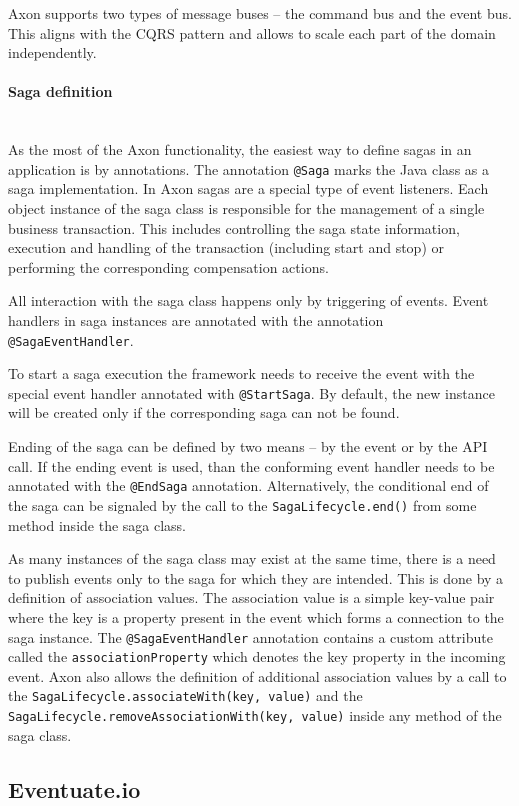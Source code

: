 \documentclass[oneside,
  digital, %
  table,   %
  nolof,     %
  nolot,     %
]{fithesis3}
\newcommand{\newlinepar}[1]{\paragraph{#1}\needspace{4\baselineskip}\mbox{}\\}
\begin{document}
Axon supports two types of message buses -- the command bus and the event bus. This aligns with the CQRS pattern and allows to scale each part of the domain independently.

\newlinepar{Saga definition}

As the most of the Axon functionality, the easiest way to define sagas in an application is by annotations. The annotation \texttt{@Saga} marks the Java class as a saga implementation. In Axon sagas are a special type of event listeners. Each object instance of the saga class is responsible for the management of a single business transaction. This includes controlling the saga state information, execution and handling of the transaction (including start and stop) or performing the corresponding compensation actions.

All interaction with the saga class happens only by triggering of events. Event handlers in saga instances are annotated with the annotation \texttt{@SagaEventHandler}. 

To start a saga execution the framework needs to receive the event with the special event handler annotated with \texttt{@StartSaga}. By default, the new instance will be created only if the corresponding saga can not be found.

Ending of the saga can be defined by two means -- by the event or by the API call. If the ending event is used, than the conforming event handler needs to be annotated with the \texttt{@EndSaga} annotation. Alternatively, the conditional end of the saga can be signaled by the call to the \texttt{SagaLifecycle.end()} from some method inside the saga class.

As many instances of the saga class may exist at the same time, there is a need to publish events only to the saga for which they are intended. This is done by a definition of association values. The association value is a simple key-value pair where the key is a property present in the event which forms a connection to the saga instance. The \texttt{@SagaEventHandler} annotation contains a custom attribute called the \texttt{associationProperty} which denotes the key property in the incoming event. Axon also allows the definition of additional association values by a call to the \texttt{SagaLifecycle.associateWith(key, value)} and the \texttt{SagaLifecycle.removeAssociationWith(key, value)} inside any method of the saga class.

\subsection{Eventuate.io}
\end{document}
